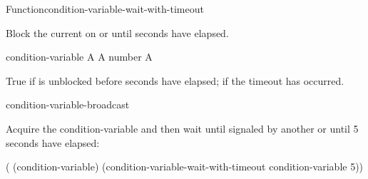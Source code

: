 \begin{functiondoc}{Function}{condition-variable-wait-with-timeout}%
  {
    \returns{} }

%

\fnsyntax

\fnpurpose Block the current  on
 or until  seconds have
elapsed.

\fnpackage {}

\fnmodule {}

\fnargs
\begin{args}{condition-variable}
 A 
\arg[seconds] A number
\arg[boolean] A 
\end{args}

\fnreturns True if  is unblocked before
 seconds have elapsed; \nil{} if the timeout has occurred.

\fnerrors
\nocvlock{}
\par
\nothreads{}

\begin{alsos}{condition-variable-broadcast}
\end{alsos}

%
\fnexample Acquire the condition-variable  and then wait until
signaled by another  or until 5 seconds have elapsed:
%
\W\supp
\begin{example}
  ( (condition-variable)
    (condition-variable-wait-with-timeout condition-variable 5))
\end{example}

\end{functiondoc}


